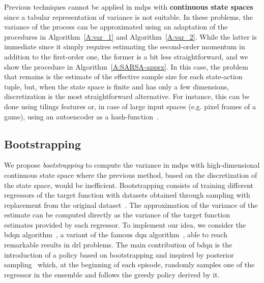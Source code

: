 Previous techniques cannot be applied in \glspl{mdp} with \textbf{continuous state spaces} since a tabular representation of variance is not suitable. In these problems, the variance of the process can be approximated using an adaptation of the procedures in Algorithm~\ref{A:var_1} and Algorithm~\ref{A:var_2}. While the latter is immediate since it simply requires estimating the second-order momentum in addition to the first-order one, the former is a bit less straightforward, and we show the procedure in Algorithm~\ref{A:SARSA-apprx}. In this case, the problem that remains is the estimate of the effective sample size for each state-action tuple, but, when the state space is finite and has only a few dimensions, discretization is the most straightforward alternative. For instance, this can be done using tilings features or, in case of large input spaces (e.g. pixel frames of a game), using an autoencoder as a hash-function~\cite{tang2017exploration}.

\subsection{Bootstrapping}
We propose \textit{bootstrapping} to compute the variance in \glspl{mdp} with high-dimensional continuous state space where the previous method, based on the discretization of the state space, would be inefficient. Bootstrapping consists of training different regressors of the target function with datasets obtained through sampling with replacement from the original dataset~\cite{doi:10.1162/089976600300015204}. The approximation of the variance of the estimate can be computed directly as the variance of the target function estimates provided by each regressor. To implement our idea, we consider the \gls{bdqn} algorithm~\cite{osband2017deep}, a variant of the famous \gls{dqn} algorithm~\cite{mnih2015human}, able to reach remarkable results in \gls{drl} problems. The main contribution of \gls{bdqn} is the introduction of a policy based on bootstrapping and inspired by posterior sampling~\cite{osband2013more} which, at the beginning of each episode, randomly samples one of the regressor in the ensemble and follows the greedy policy derived by it.

